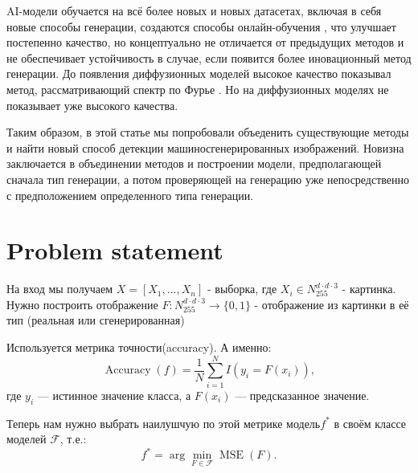 \documentclass{article}
\begin{document}
AI-модели обучается на всё более новых и новых датасетах, включая в себя новые способы генерации, создаются способы онлайн-обучения \cite{OnlineDetection}, что улучшает постепенно качество, но концептуально не отличается от предыдущих методов и не обеспечивает устойчивость в случае, если появится более иновационный метод генерации. До появления диффузионных моделей высокое качество показывал метод, рассматривающий спектр по Фурье \cite{ZeroShot}. Но на диффузионных моделях не показывает уже высокого качества.

Таким образом, в этой статье мы попробовали объеденить существующие методы и найти новый способ детекции машиносгенерированных изображений. Новизна заключается в объединении методов и построении модели, предполагающей сначала тип генерации, а потом проверяющей на генерацию уже непосредственно с предположением определенного типа генерации.



\section{Problem statement}
\label{sec:problem_statement}



На вход мы получаем $X = [X_1, ..., X_n]$ -  выборка, где $X_i \in N_{255}^{d \cdot d \cdot 3}$ - картинка. \\

Нужно построить отображение $F: N_{255}^{d \cdot d \cdot 3} \rightarrow \{ 0, 1 \} $ - отображение из картинки в её тип (реальная или сгенерированная)

Используется метрика точности(accuracy). А именно:
\[
	\operatorname{Accuracy}(f) = \frac{1}{N} \sum_{i=1}^N  I{( y_i = F(x_i))} ,
\]
где \( y_i \) --- истинное значение класса, а \( F(x_i) \) --- предсказанное значение.

Теперь нам нужно выбрать наилушчую по этой метрике модель\( f^* \) в своём классе моделей \( \mathcal{F} \), т.е.:
\[
	f^* = \arg\min_{F \in \mathcal{F}} \operatorname{MSE}(F).
\]


\end{document}
